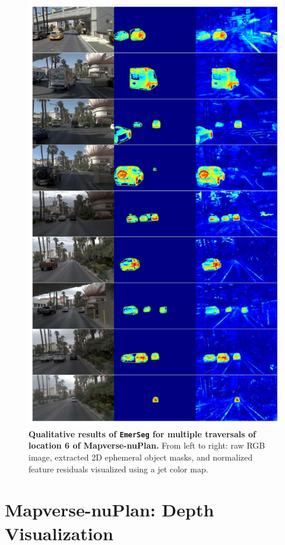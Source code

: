\begin{figure}[ht]
    \centering
    \includegraphics[width=0.88\linewidth]{figs_compressed/EmerSeg-loc6_compressed.pdf}
    \caption{\textbf{Qualitative results of \texttt{EmerSeg} for multiple traversals of location 6 of Mapverse-nuPlan.} From left to right: raw RGB image, extracted 2D ephemeral object masks, and normalized feature residuals visualized using a jet color map.}
    \label{fig:vegas-loc6}
\end{figure}



\clearpage
\section{Mapverse-nuPlan: Depth Visualization}
\label{sec:depth-nuplan-app}

